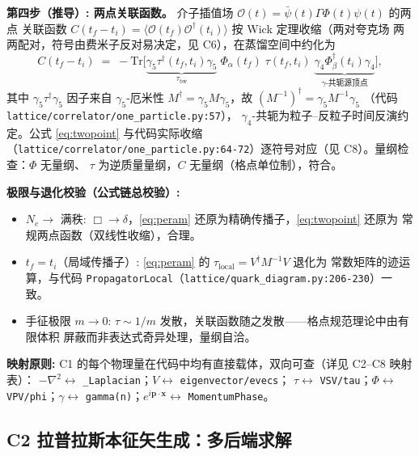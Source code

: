 \documentclass[UTF8]{ctexart}
\begin{document}
\textbf{第四步（推导）: 两点关联函数。} 介子插值场 $\mathcal{O}(t)=\bar\psi(t)\Gamma\Phi(t)\psi(t)$ 的两点
关联函数 $C(t_f-t_i)=\langle \mathcal{O}(t_f)\mathcal{O}^\dagger(t_i)\rangle$ 按 Wick 定理收缩（两对夸克场
两两配对，符号由费米子反对易决定，见 C6），在蒸馏空间中约化为
\begin{equation}\label{eq:twopoint}
C(t_f-t_i) \;=\; -\mathrm{Tr}\Big[
\underbrace{\gamma_5 \tau^\dagger(t_f,t_i)\gamma_5}_{\tau_{\mathrm{bw}}}
\; \Phi_\alpha(t_f) \; \tau(t_f,t_i) \;
\underbrace{\gamma_4 \Phi_\beta^\dagger(t_i)\gamma_4}_{\gamma\text{-共轭源顶点}} \Big],
\end{equation}
其中 $\gamma_5 \tau^\dagger \gamma_5$ 因子来自 $\gamma_5$-厄米性
$M^\dagger = \gamma_5 M\gamma_5$，故 $(M^{-1})^\dagger = \gamma_5 M^{-1}\gamma_5$
（代码 \texttt{\nolinkurl{lattice/correlator/one_particle.py:57}}），
$\gamma_4$-共轭为粒子--反粒子时间反演约定。公式 \eqref{eq:twopoint} 与代码实际收缩
（\texttt{lattice/correlator/one\_particle.py:64-72}）逐符号对应（见 C8）。量纲检查：$\Phi$ 无量纲、
$\tau$ 为逆质量量纲，$C$ 无量纲（格点单位制），符合。

\textbf{极限与退化校验（公式链总校验）:}
\begin{itemize}
\item $N_e\to$ 满秩: $\Box\to\delta$，\eqref{eq:peram} 还原为精确传播子，\eqref{eq:twopoint} 还原为
  常规两点函数（双线性收缩），合理。
\item $t_f=t_i$（局域传播子）: \eqref{eq:peram} 的 $\tau_{\mathrm{local}} = V^\dagger M^{-1}V$ 退化为
  常数矩阵的迹运算，与代码 \texttt{PropagatorLocal}（\texttt{lattice/quark\_diagram.py:206-230}）一致。
\item 手征极限 $m\to 0$: $\tau \sim 1/m$ 发散，关联函数随之发散——格点规范理论中由有限体积
  屏蔽而非表达式奇异处理，量纲自洽。
\end{itemize}

\begin{mapbox}
\textbf{映射原则:} C1 的每个物理量在代码中均有直接载体，双向可查（详见 C2--C8 映射表）：
$-\nabla^2 \leftrightarrow$ \texttt{\_Laplacian}；$V \leftrightarrow$ \texttt{eigenvector/evecs}；
$\tau \leftrightarrow$ \texttt{VSV/tau}；$\Phi \leftrightarrow$ \texttt{VPV/phi}；$\gamma \leftrightarrow$
\texttt{gamma(n)}；$e^{i\mathbf p\cdot\mathbf x} \leftrightarrow$ \texttt{MomentumPhase}。
\end{mapbox}

\subsection{C2 拉普拉斯本征矢生成：多后端求解}
\label{sec:c2}
\end{document}
